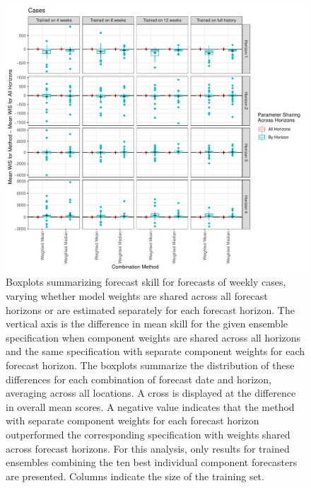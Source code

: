 \documentclass[review]{elsarticle}
\begin{document}
\begin{figure}
  \includegraphics[width=\textwidth]{figures/wis_boxplots_horizon_grouping_Cases.pdf}
  \caption{Boxplots summarizing forecast skill for forecasts of weekly cases, varying whether model weights are shared across all forecast horizons or are estimated separately for each forecast horizon.
  The vertical axis is the difference in mean skill for the given ensemble specification when component weights are shared across all horizons and the same specification with separate component weights for each forecast horizon.
  The boxplots summarize the distribution of these differences for each combination of forecast date and horizon, averaging across all locations.
  A cross is displayed at the difference in overall mean scores.
  A negative value indicates that the method with separate component weights for each forecast horizon outperformed the corresponding specification with weights shared across forecast horizons.
  For this analysis, only results for trained ensembles combining the ten best individual component forecasters are presented.
  Columns indicate the size of the training set.}
\end{figure}
\end{document}
